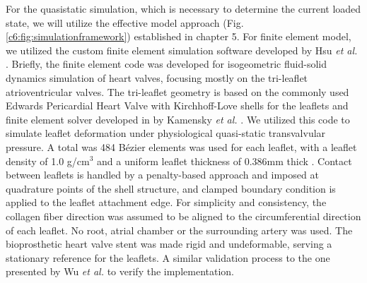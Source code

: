     For the quasistatic simulation, which is necessary to determine the current loaded state, we will utilize the effective model approach (Fig. \ref{c6:fig:simulationframework}) established in chapter 5. For finite element model, we utilized the custom finite element simulation software developed by Hsu \textit{et al.} \cite{hsu_dynamic_2015, kamensky_immersogeometric_2015, kiendl_isogeometric_2015, wu_anisotropic_2018}. Briefly, the finite element code was developed for isogeometric fluid-solid dynamics simulation of heart valves, focusing mostly on the tri-leaflet atrioventricular valves. The tri-leaflet geometry is based on the commonly used Edwards Pericardial Heart Valve with Kirchhoff-Love shells for the leaflets \cite{kiendl_isogeometric_2015} and finite element solver developed in by Kamensky \textit{et al.} \cite {kamensky_immersogeometric_2015}. We utilized this code to simulate leaflet deformation under physiological quasi-static transvalvular pressure. 
    A total was 484 B\'ezier elements was used for each leaflet, with a leaflet density of 1.0 g/cm$^3$ and a uniform leaflet thickness of 0.386mm thick \cite{hsu_dynamic_2015}. Contact between leaflets is handled by a penalty-based approach and imposed at quadrature points of the shell structure, and clamped boundary condition is applied to the leaflet attachment edge. 
    For simplicity and consistency, the collagen fiber direction was assumed to be aligned to the circumferential direction of each leaflet. No root, atrial chamber or the surrounding artery was used. The bioprosthetic heart valve stent was made rigid and undeformable, serving a stationary reference for the leaflets. A similar validation process to the one presented by Wu \textit{et al.} \cite{wu_anisotropic_2018} to verify the implementation.
    
